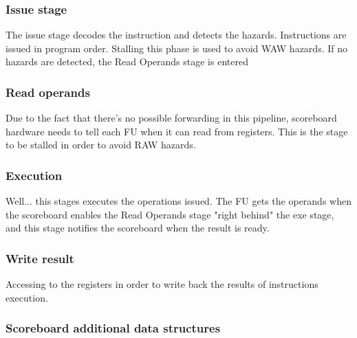 \documentclass[10pt,a4paper]{article}
\begin{document}
				\subsubsection{Issue stage}
					The issue stage decodes the instruction and detects the hazards. Instructions are issued in program order. Stalling this phase is used to avoid WAW hazards. If no hazards are detected, the Read Operands stage is entered
					
				\subsubsection{Read operands}
			 		Due to the fact that there's no possible forwarding in this pipeline, scoreboard hardware needs to tell each FU when it can read from registers. This is the stage to be stalled in order to avoid RAW hazards.
			 		
		 		\subsubsection{Execution}
		 			Well... this stages executes the operations issued. The FU gets the operands when the scoreboard enables the Read Operands stage "right behind" the exe stage, and this stage notifies the scoreboard when the result is ready. 
		 			
	 			\subsubsection{Write result}
	 				Accessing to the registers in order to write back the results of instructions execution.
	 				
 				\subsubsection{Scoreboard additional data structures}
			 	
\end{document}
